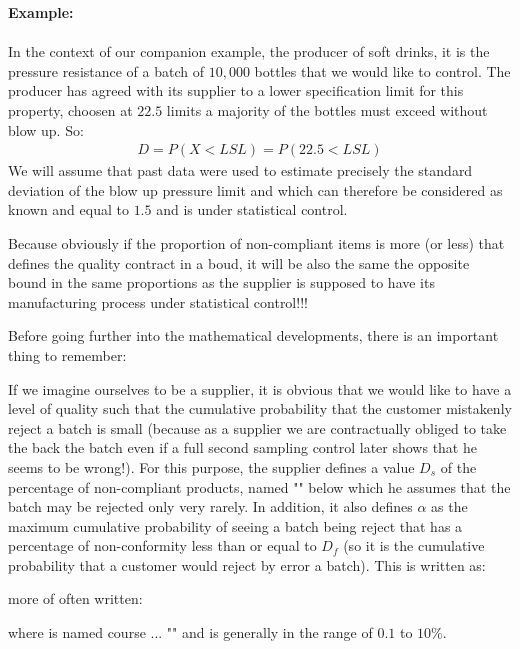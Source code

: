 	\begin{tcolorbox}[colframe=black,colback=white,sharp corners]
	\textbf{{\Large {}}Example:}\\\\
	In the context of our companion example, the producer of soft drinks, it is the pressure resistance of a batch of $10,000$ bottles that we would like to control. The producer has agreed with its supplier to a lower specification limit for this property, choosen at $22.5$ limits a majority of the bottles must exceed without blow up. So:
	\begin{gather*}
		D=P(X<LSL)=P(22.5<LSL)
	\end{gather*}
	We will assume that past data were used to estimate precisely the standard deviation of the blow up pressure limit and which can therefore be considered as known and equal to $1.5$ and is under statistical control.
	\end{tcolorbox}
	Because obviously if the proportion of non-compliant items is more (or less) that defines the quality contract in a boud, it will be also the same the opposite bound in the same proportions as the supplier is supposed to have its manufacturing process under statistical control!!!

	Before going further into the mathematical developments, there is an important thing to remember:

	If we imagine ourselves to be a supplier, it is obvious that we would like to have a level of quality such that the cumulative probability that the customer mistakenly reject a batch is small (because as a supplier we are contractually obliged to take the back the batch even if a full second sampling control later shows that he seems to be wrong!). For this purpose, the supplier defines a value $D_s$ of the percentage of non-compliant products, named "" below which he assumes that the batch may be rejected only very rarely. In addition, it also defines $\alpha$ as the maximum cumulative probability of seeing a batch being reject that has a percentage of non-conformity less than or equal to $D_f$ (so it is the cumulative probability that a customer would reject by error a batch). This is written as:
	
	more of often written:
	
	where is named course ... "" and is generally in the range of $0.1$ to $10\%$.
	
